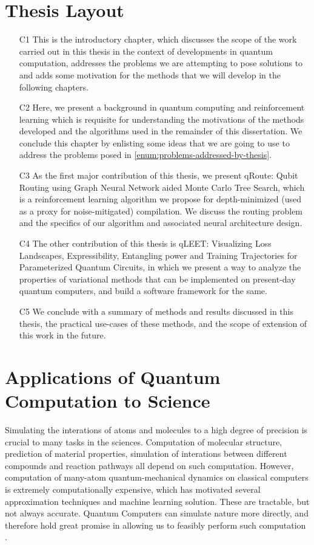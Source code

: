 \section{Thesis Layout}

\begin{itemize}
    \item[C1] This is the introductory chapter, which discusses the scope of the work carried out in this thesis in the context of developments in quantum computation, addresses the problems we are attempting to pose solutions to and adds some motivation for the methods that we will develop in the following chapters.
    \item[C2] Here, we present a background in quantum computing and reinforcement learning which is requisite for understanding the motivations of the methods developed and the algorithms used in the remainder of this dissertation. We conclude this chapter by enlisting some ideas that we are going to use to address the problems posed in \ref{enum:problems-addressed-by-thesis}.
    \item[C3] As the first major contribution of this thesis, we present qRoute: Qubit Routing using Graph Neural Network aided Monte Carlo Tree Search, which is a reinforcement learning algorithm we propose for depth-minimized (used as a proxy for noise-mitigated) compilation. We discuss the routing problem and the specifics of our algorithm and associated neural architecture design.
    \item[C4] The other contribution of this thesis is qLEET: Visualizing Loss Landscapes, Expressibility, Entangling power and Training Trajectories for Parameterized Quantum Circuits, in which we present a way to analyze the properties of variational methods that can be implemented on present-day quantum computers, and build a software framework for the same.
    \item[C5] We conclude with a summary of methods and results discussed in this thesis, the practical use-cases of these methods, and the scope of extension of this work in the future.
\end{itemize}


\section{Applications of Quantum Computation to Science}

Simulating the interations of atoms and molecules to a high degree of precision is crucial to many tasks in the sciences. Computation of molecular structure, prediction of material properties, simulation of interations between different compounds and reaction pathways all depend on such computation. However, computation of many-atom quantum-mechanical dynamics on classical computers is extremely computationally expensive, which has motivated several approximation techniques and machine learning solution. These are tractable, but not always accurate. Quantum Computers can simulate nature more directly, and therefore hold great promise in allowing us to feasibly perform such computation \cite{feynman-quantum-simulating-physics,qpf-simulating-chemistry}.

